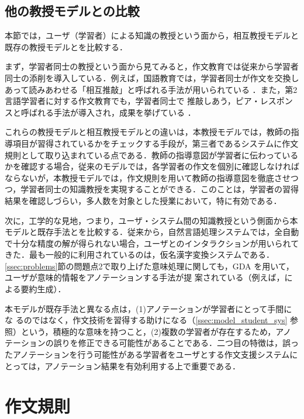 \documentclass[japanese]{jnlp_1.4}
\def\mod{}
\begin{document}
{\mod
\subsection{他の教授モデルとの比較}

本節では，ユーザ（学習者）による知識の教授という面から，相互教授モデルと
既存の教授モデルとを比較する．

まず，学習者同士の教授という面から見てみると，作文教育では従来から学習者
同士の添削を導入している．例えば，国語教育では，学習者同士が作文を交換し
あって読みあわせる「相互推敲」と呼ばれる手法が用いられている
\cite{tazika2006}．また，第2言語学習者に対する作文教育でも，学習者同士で
推敲しあう，ピア・レスポンスと呼ばれる手法が導入され，成果を挙げている
\cite{harada2006}．

これらの教授モデルと相互教授モデルとの違いは，本教授モデルでは，教師の指
導項目が習得されているかをチェックする手段が，第三者であるシステムに作文
規則として取り込まれている点である．教師の指導意図が学習者に伝わっている
かを確認する場合，従来のモデルでは，各学習者の作文を個別に確認しなければ
ならないが，本教授モデルでは，作文規則を用いて教師の指導意図を徹底させつ
つ，学習者同士の知識教授を実現することができる．このことは，学習者の習得
結果を確認しづらい，多人数を対象とした授業において，特に有効である．


次に，工学的な見地，つまり，ユーザ・システム間の知識教授という側面から本
モデルと既存手法とを比較する．従来から，自然言語処理システムでは，全自動
で十分な精度の解が得られない場合，ユーザとのインタラクションが用いられて
きた．最も一般的に利用されているのは，仮名漢字変換システムである．
\ref{ssec:problems}節の問題点2で取り上げた意味処理に関しても，GDA \cite{橋
田浩一:19980701}を用いて，ユーザが意味的情報をアノテーションする手法が提
案されている（例えば，\cite{綾2005}による要約生成）．

本モデルが既存手法と異なる点は，(1)アノテーションが学習者にとって手間にな
るのではなく，作文技術を習得する助けになる（\ref{ssec:model_student_sys}
参照）という，積極的な意味を持つこと，(2)複数の学習者が存在するため，アノ
テーションの誤りを修正できる可能性があることである．二つ目の特徴は，誤っ
たアノテーションを行う可能性がある学習者をユーザとする作文支援システムに
とっては，アノテーション結果を有効利用する上で重要である．} 



\section{作文規則}\label{sec:composition_rule}
\end{document}
